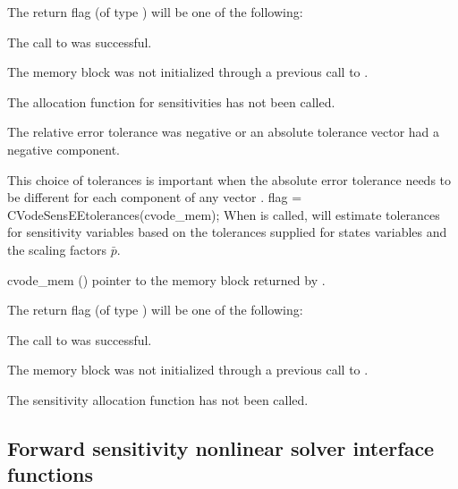 {
  The return flag  (of type ) will be one of the following:
  \begin{args}
  \item[\Id{CV\_SUCCESS}]
    The call to  was successful.
  \item[\Id{CV\_MEM\_NULL}] 
    The {\cvodes} memory block was not initialized through a previous call to
    .
  \item[\Id{CV\_NO\_SENS}] 
    The allocation function for sensitivities has not been called.
  \item[\Id{CV\_ILL\_INPUT}] 
    The relative error tolerance was negative or an absolute tolerance vector
    had a negative component.
  \end{args}
}
{
  This choice of tolerances is important when the absolute error tolerance needs to
  be different for each component of any vector . 
}
{
  flag = CVodeSensEEtolerances(cvode\_mem);
}
{
  When  is called, {\cvodes} will estimate tolerances for
  sensitivity variables based on the tolerances supplied for states variables
  and the scaling factors $\bar p$.
}
{
  \begin{args}
  \item[cvode\_mem] ()
    pointer to the {\cvodes} memory block returned by .
  \end{args}
}
{
  The return flag  (of type ) will be one of the following:
  \begin{args}
  \item[\Id{CV\_SUCCESS}]
    The call to  was successful.
  \item[\Id{CV\_MEM\_NULL}] 
    The {\cvodes} memory block was not initialized through a previous call to
    .
  \item[\Id{CV\_NO\_SENS}] 
    The sensitivity allocation function has not been called.
  \end{args}
}

{}
\subsection{Forward sensitivity nonlinear solver interface functions}
\label{sss:cvfwd_nonlin_solv_init}

